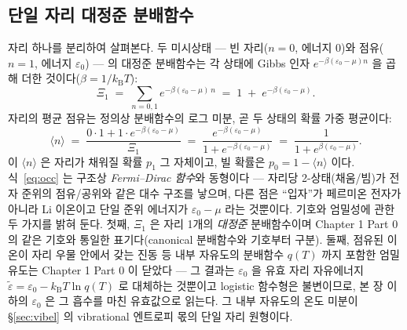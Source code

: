 \documentclass[11pt,a4paper]{article}
\newcommand{\kB}{k_{\mathrm B}}
\newcommand{\avg}[1]{\langle #1\rangle}
\begin{document}
\subsection{단일 자리 대정준 분배함수}
자리 하나를 분리하여 살펴본다. 두 미시상태 — 빈 자리($n=0$, 에너지 0)와 점유($n=1$, 에너지 $\varepsilon_0$) — 의
대정준 분배함수는 각 상태에 Gibbs 인자 $e^{-\beta(\varepsilon_0-\mu)n}$ 을 곱해 더한 것이다($\beta=1/\kB T$):
\begin{equation}
\Xi_1 \;=\; \sum_{n=0,1} e^{-\beta(\varepsilon_0-\mu)\,n}
\;=\; 1 \;+\; e^{-\beta(\varepsilon_0-\mu)}.
\label{eq:Z1}
\end{equation}
자리의 평균 점유는 정의상 분배함수의 로그 미분, 곧 두 상태의 확률 가중 평균이다:
\begin{equation}
\avg{n} \;=\; \frac{0\cdot 1 + 1\cdot e^{-\beta(\varepsilon_0-\mu)}}{\Xi_1}
\;=\; \frac{e^{-\beta(\varepsilon_0-\mu)}}{1+e^{-\beta(\varepsilon_0-\mu)}}
\;=\; \frac{1}{1+e^{\beta(\varepsilon_0-\mu)}}.
\label{eq:occ}
\end{equation}
이 $\avg{n}$ 은 자리가 채워질 확률 $p_1$ 그 자체이고, 빌 확률은 $p_0=1-\avg{n}$ 이다. 식~\eqref{eq:occ} 는
구조상 \emph{Fermi--Dirac 함수}와 동형이다 — 자리당 2-상태(채움/빔)가 전자 준위의 점유/공위와 같은
대수 구조를 낳으며, 다른 점은 ``입자''가 페르미온 전자가 아니라 Li 이온이고 단일 준위 에너지가
$\varepsilon_0-\mu$ 라는 것뿐이다. 기호와 엄밀성에 관한 두 가지를 밝혀 둔다. 첫째, $\Xi_1$ 은 자리 1개의
\emph{대정준} 분배함수이며 Chapter 1 Part 0 의 같은 기호와 통일한 표기다(canonical 분배함수와 기호부터
구분). 둘째, 점유된 이온이 자리 우물 안에서 갖는 진동 등 내부 자유도의 분배함수 $q(T)$ 까지 포함한 엄밀
유도는 Chapter 1 Part 0 이 닫았다 — 그 결과는 $\varepsilon_0$ 을 유효 자리 자유에너지
$\tilde\varepsilon=\varepsilon_0-\kB T\ln q(T)$ 로 대체하는 것뿐이고 logistic 함수형은 불변이므로, 본 장
이하의 $\varepsilon_0$ 은 그 흡수를 마친 유효값으로 읽는다. 그 내부 자유도의 온도 미분이
\S\ref{sec:vibel} 의 vibrational 엔트로피 몫의 단일 자리 원형이다.
\end{document}
